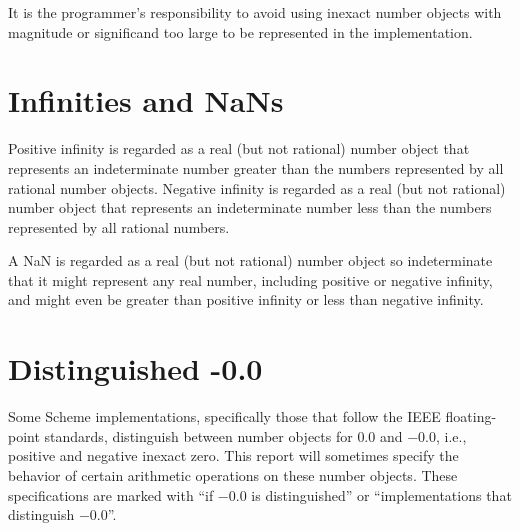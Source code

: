 It is the programmer's responsibility to avoid using inexact number
objects with magnitude or significand too large to be represented in
the implementation.

\section{Infinities and NaNs}

Positive infinity is regarded as a real (but not rational) number
object that represents an indeterminate number greater than the
numbers represented by all rational number objects.  Negative infinity
is regarded as a real (but not rational) number object that represents
an indeterminate number less than the numbers represented by all
rational numbers.

A NaN is regarded as a real (but not rational) number object so
indeterminate that it might represent any real number, including
positive or negative infinity, and might even be greater than positive
infinity or less than negative infinity.

\section{Distinguished -0.0}

Some Scheme implementations, specifically those that follow the IEEE
floating-point standards, distinguish between number objects for $0.0$
and $-0.0$, i.e., positive and negative inexact zero.  This report
will sometimes specify the behavior of certain arithmetic operations
on these number objects.  These specifications are marked with ``if
$-0.0$ is distinguished'' or ``implementations that distinguish
$-0.0$''.


